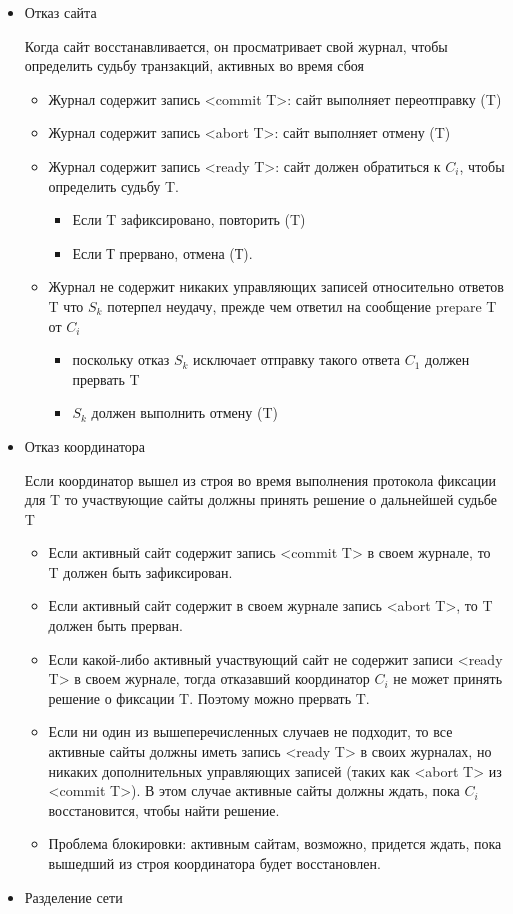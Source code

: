\begin{itemize}
\item Отказ сайта

Когда сайт восстанавливается, он просматривает свой журнал, чтобы определить судьбу транзакций, активных во время сбоя %
\begin{itemize}
\item Журнал содержит запись <commit T>: сайт выполняет переотправку (T)
\item Журнал содержит запись <abort T>: сайт выполняет отмену (T)
\item Журнал содержит запись <ready T>: сайт должен обратиться к $C_i$, чтобы определить судьбу T.
\begin{itemize}
\item Если T зафиксировано, повторить (T)
\item Если Т прервано, отмена (Т).
\end{itemize}
\item Журнал не содержит никаких управляющих записей относительно ответов T что $S_k$ потерпел неудачу, прежде чем ответил на сообщение prepare T от $C_i$
\begin{itemize}
\item поскольку отказ $S_k$ исключает отправку такого ответа $C_1$ должен прервать T
\item $S_k$ должен выполнить отмену (T)
\end{itemize}
\end{itemize}  

\item Отказ координатора

Если координатор вышел из строя во время выполнения протокола фиксации для T то участвующие сайты должны принять решение о дальнейшей судьбе T %
\begin{itemize}
\item Если активный сайт содержит запись <commit T> в своем журнале, то T должен быть зафиксирован.
\item Если активный сайт содержит в своем журнале запись <abort T>, то T должен быть прерван.
\item Если какой-либо активный участвующий сайт не содержит записи <ready T> в своем журнале, тогда отказавший координатор $C_i$ не может принять решение о фиксации T. Поэтому можно прервать T.
\item Если ни один из вышеперечисленных случаев не подходит, то все активные сайты должны иметь запись <ready T> в своих журналах, но никаких дополнительных управляющих записей (таких как <abort T> из <commit T>). В этом случае активные сайты должны ждать, пока $C_i$ восстановится, чтобы найти решение.
\item Проблема блокировки: активным сайтам, возможно, придется ждать, пока вышедший из строя координатора будет восстановлен.
\end{itemize}
\item Разделение сети


\end{itemize}
